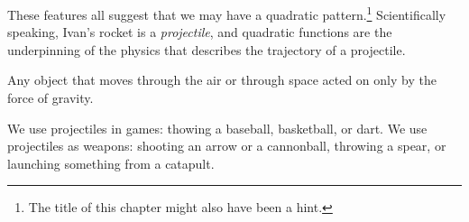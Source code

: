 These features all suggest that we may have a quadratic pattern.\footnote{The title of this chapter might also have been a hint.} Scientifically speaking, Ivan's rocket is a \textit{projectile}, and quadratic functions are the underpinning of the physics that describes the trajectory of a projectile.

%
%
%
%

\begin{boxeddef}[Projectile]
Any object that moves through the air or through space acted on only by the force of gravity.
\end{boxeddef}

We use projectiles in games: thowing a baseball, basketball, or dart. We use projectiles as weapons: shooting an arrow or a cannonball, throwing a spear, or launching something from a catapult.


